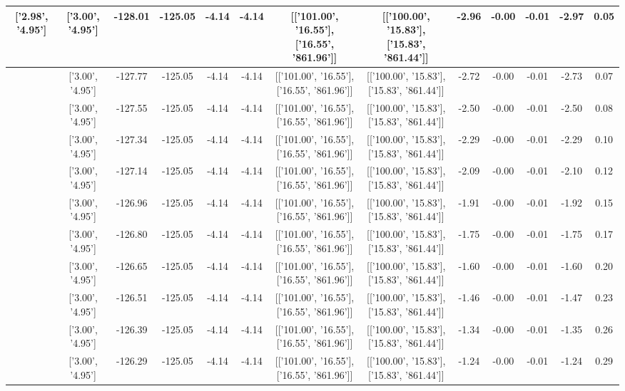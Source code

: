 \begin{table}[htbp]
\begin{adjustbox}{angle=90}
\begin{tabular}{|c|c|c|c|c|c|c|c|c|c|c|c|c|}
 ['2.98', '4.95'] & ['3.00', '4.95'] & -128.01 & -125.05 & -4.14 & -4.14 & [['101.00', '16.55'], ['16.55', '861.96']] & [['100.00', '15.83'], ['15.83', '861.44']] & -2.96 & -0.00 & -0.01 & -2.97 & 0.05\\ \hline
 ['2.98', '4.95'] & ['3.00', '4.95'] & -127.77 & -125.05 & -4.14 & -4.14 & [['101.00', '16.55'], ['16.55', '861.96']] & [['100.00', '15.83'], ['15.83', '861.44']] & -2.72 & -0.00 & -0.01 & -2.73 & 0.07\\ \hline
 ['2.98', '4.95'] & ['3.00', '4.95'] & -127.55 & -125.05 & -4.14 & -4.14 & [['101.00', '16.55'], ['16.55', '861.96']] & [['100.00', '15.83'], ['15.83', '861.44']] & -2.50 & -0.00 & -0.01 & -2.50 & 0.08\\ \hline
 ['2.98', '4.95'] & ['3.00', '4.95'] & -127.34 & -125.05 & -4.14 & -4.14 & [['101.00', '16.55'], ['16.55', '861.96']] & [['100.00', '15.83'], ['15.83', '861.44']] & -2.29 & -0.00 & -0.01 & -2.29 & 0.10\\ \hline
 ['2.98', '4.95'] & ['3.00', '4.95'] & -127.14 & -125.05 & -4.14 & -4.14 & [['101.00', '16.55'], ['16.55', '861.96']] & [['100.00', '15.83'], ['15.83', '861.44']] & -2.09 & -0.00 & -0.01 & -2.10 & 0.12\\ \hline
 ['2.99', '4.95'] & ['3.00', '4.95'] & -126.96 & -125.05 & -4.14 & -4.14 & [['101.00', '16.55'], ['16.55', '861.96']] & [['100.00', '15.83'], ['15.83', '861.44']] & -1.91 & -0.00 & -0.01 & -1.92 & 0.15\\ \hline
 ['2.99', '4.95'] & ['3.00', '4.95'] & -126.80 & -125.05 & -4.14 & -4.14 & [['101.00', '16.55'], ['16.55', '861.96']] & [['100.00', '15.83'], ['15.83', '861.44']] & -1.75 & -0.00 & -0.01 & -1.75 & 0.17\\ \hline
 ['2.99', '4.95'] & ['3.00', '4.95'] & -126.65 & -125.05 & -4.14 & -4.14 & [['101.00', '16.55'], ['16.55', '861.96']] & [['100.00', '15.83'], ['15.83', '861.44']] & -1.60 & -0.00 & -0.01 & -1.60 & 0.20\\ \hline
 ['2.99', '4.95'] & ['3.00', '4.95'] & -126.51 & -125.05 & -4.14 & -4.14 & [['101.00', '16.55'], ['16.55', '861.96']] & [['100.00', '15.83'], ['15.83', '861.44']] & -1.46 & -0.00 & -0.01 & -1.47 & 0.23\\ \hline
 ['2.99', '4.95'] & ['3.00', '4.95'] & -126.39 & -125.05 & -4.14 & -4.14 & [['101.00', '16.55'], ['16.55', '861.96']] & [['100.00', '15.83'], ['15.83', '861.44']] & -1.34 & -0.00 & -0.01 & -1.35 & 0.26\\ \hline
 ['2.99', '4.95'] & ['3.00', '4.95'] & -126.29 & -125.05 & -4.14 & -4.14 & [['101.00', '16.55'], ['16.55', '861.96']] & [['100.00', '15.83'], ['15.83', '861.44']] & -1.24 & -0.00 & -0.01 & -1.24 & 0.29\\ \hline

\end{tabular}
\end{adjustbox}
\end{table}
